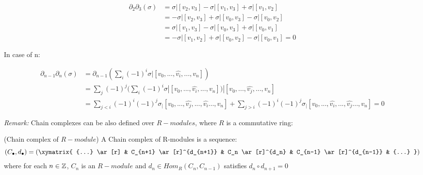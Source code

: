 \documentclass[11pt,a4paper]{report}
\begin{document}
            \begin{equation}
                \begin{aligned}
                    \partial_2 \partial_3(\sigma) &= \sigma | [v_2, v_3] - \sigma | [v_1, v_3] + \sigma | [v_1, v_2] \\
                    &= -\sigma | [v_2, v_3] + \sigma | [v_0, v_3] - \sigma | [v_0, v_2] \\
                    &= \sigma | [v_1, v_3] - \sigma | [v_0, v_3] + \sigma | [v_0, v_1] \\
                    &= -\sigma | [v_1, v_2] + \sigma | [v_0, v_2] - \sigma | [v_0, v_1] = 0
                \end{aligned}
            \end{equation}

        In case of n:

            \begin{equation}
                \begin{aligned}
                    \partial_{n-1} \partial_n(\sigma) &=  \partial_{n-1}(\sum\limits_i (-1)^i \sigma | [v_0, ... ,\hat{v_i}, ... , v_n]) \\
                    &=  \sum\limits_j (-1)^j ( \sum\limits_i (-1)^i \sigma | [v_0, ... ,\hat{v_i}, ... , v_n]) | [v_0, ... ,\hat{v_j}, ... , v_n] \\
                    &=  \sum\limits_{j<i} (-1)^i(-1)^j  \sigma_ | [v_0, ... ,\hat{v_j},... ,\hat{v_i} ... , v_n] +
                    \sum\limits_{j>i} (-1)^i(-1)^{j}  \sigma_ | [v_0, ... ,\hat{v_i},... ,\hat{v_j} ... , v_n] = 0
                \end{aligned}
            \end{equation}

        \emph{Remark: } Chain complexes can be also defined over $R-modules$, where $R$ is a commutative ring:

        \begin{defn} (Chain complex of $R-module$)
        A Chain complex of R-modules is a sequence:
                \[ (C_\bullet, d_\bullet)= (
                        \xymatrix{
                            {...}  \ar[r] &
                            C_{n+1}  \ar[r]^{d_{n+1}} &
                            C_n  \ar[r]^{d_n} &
                            C_{n-1}  \ar[r]^{d_{n-1}} &
                            {...}
                             } )
                   \]
        where for each $n \in \mathbb{Z}$, $C_n$ is an $R-module$ and $d_n \in Hom_{R}(C_n, C_{n-1})$ satisfies
        $d_n \circ d_{n+1} = 0$
        \end{defn}
\end{document}
